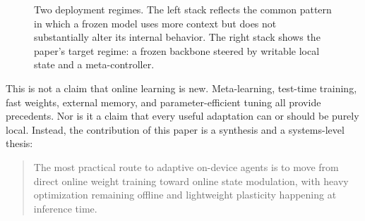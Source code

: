 \documentclass[11pt,a4paper]{article}
\begin{document}
\begin{figure}[t]
\centering
{}
\caption{Two deployment regimes. The left stack reflects the common pattern in which a frozen model uses more context but does not substantially alter its internal behavior. The right stack shows the paper's target regime: a frozen backbone steered by writable local state and a meta-controller.}
\label{fig:static_vs_plastic}
\end{figure}

This is not a claim that online learning is new. Meta-learning, test-time training, fast weights, external memory, and parameter-efficient tuning all provide precedents. Nor is it a claim that every useful adaptation can or should be purely local. Instead, the contribution of this paper is a synthesis and a systems-level thesis:

\begin{quote}
The most practical route to adaptive on-device agents is to move from direct online weight training toward online state modulation, with heavy optimization remaining offline and lightweight plasticity happening at inference time.
\end{quote}
\end{document}
